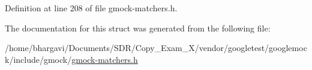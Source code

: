 Definition at line 208 of file gmock-\/matchers.\+h.



The documentation for this struct was generated from the following file\+:\begin{DoxyCompactItemize}
\item 
/home/bhargavi/\+Documents/\+S\+D\+R/\+Copy\+\_\+\+Exam\+\_\+X/vendor/googletest/googlemock/include/gmock/\hyperlink{gmock-matchers_8h}{gmock-\/matchers.\+h}\end{DoxyCompactItemize}

